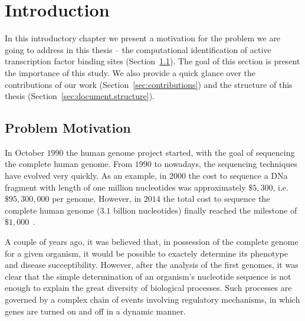 \chapter{Introduction}
\label{cha:introduction}

\graphicspath{{chapter1/figs/}}

In this introductory chapter we present a motivation for the problem we are going to address in this thesis -- the computational identification of active transcription factor binding sites (Section~\ref{sec:problem.motivation}). The goal of this section is present the importance of this study. We also provide a quick glance over the contributions of our work (Section~\ref{sec:contributions}) and the structure of this thesis (Section~\ref{sec:document.structure}).

\section{Problem Motivation}
\label{sec:problem.motivation}

In October $1990$ the human genome project started, with the goal of sequencing the complete human genome. From $1990$ to nowadays, the sequencing techniques have evolved very quickly. As an example, in $2000$ the cost to sequence a DNa fragment with length of one million nucleotides was approximately $\$5,300$, i.e. $\$95,300,000$ per genome. However, in $2014$ the total cost to sequence the complete human genome (\approxy$3.1$ billion nucleotides) finally reached the milestone of $\$1,000$~\cite{hayden2014}.

A couple of years ago, it was believed that, in possession of the complete genome for a given organism, it would be possible to exactely determine its phenotype and disease succeptibility. However, after the analysis of the first genomes, it was clear that the simple determination of an organism's nucleotide sequence is not enough to explain the great diversity of biological processes. Such processes are governed by a complex chain of events involving regulatory mechanisms, in which genes are turned on and off in a dynamic manner.

